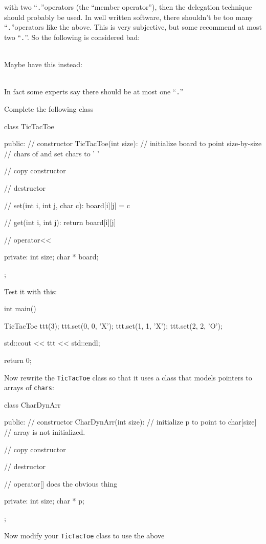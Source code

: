 with two ``\texttt{.}''operators (the ``member operator''), then the
delegation technique should probably be used. In well written software,
there shouldn't be too many ``\texttt{.}''operators like
the above. This is very subjective, but some recommend at most two
``\texttt{.}''. So the following is considered bad:

\\

Maybe have this instead:

\\

In fact some experts say there should be at most one ``\texttt{.}''

\begin{ex} Complete the following class

\begin{console}
class TicTacToe
{
public:
        // constructor TicTacToe(int size):
        // initialize board to point size-by-size
        // chars of and set chars to ' '

        // copy constructor

        // destructor

        // set(int i, int j, char c): board[i][j] = c

        // get(int i, int j): return board[i][j]

        // operator<<

private:
        int size;
        char * board;
};
\end{console}

Test it with this:

\begin{console}
int main()
{   
    TicTacToe ttt(3);
    ttt.set(0, 0, 'X');
    ttt.set(1, 1, 'X');
    ttt.set(2, 2, 'O');

    std::cout << ttt << std::endl;

    return 0;
}
\end{console}

Now rewrite the \texttt{TicTacToe} class so that it uses a class that
models pointers to arrays of \texttt{chars}:

\begin{console}
class CharDynArr
{
public:
        // constructor CharDynArr(int size):
        // initialize p to point to char[size]
        // array is not initialized.

        // copy constructor

        // destructor

        // operator[] does the obvious thing

private:
        int size;
        char * p;
};
\end{console}

Now modify your \texttt{TicTacToe} class to use the above

\end{ex}
